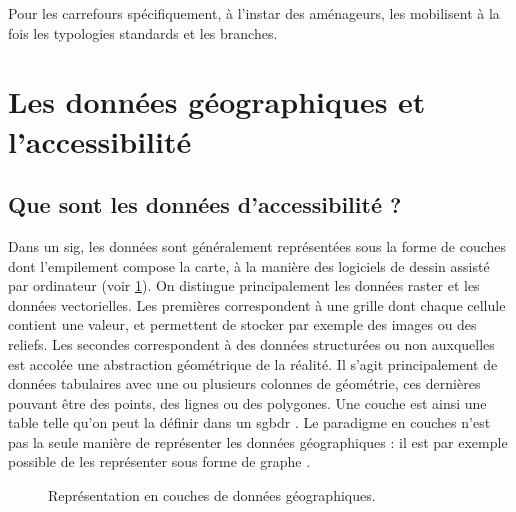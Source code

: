 Pour les carrefours spécifiquement, à l'instar des aménageurs, les \ipas{} mobilisent à la fois les typologies standards et les branches. 

\section{Les données géographiques et l'accessibilité}

\subsection{Que sont les données d'accessibilité ?}


Dans un \gls{sig}, les données sont généralement représentées sous la forme de couches dont l'empilement compose la carte, à la manière des logiciels de dessin assisté par ordinateur (voir \ref{fig:geodatalayers}). On distingue principalement les données raster et les données vectorielles. Les premières correspondent à une grille dont chaque cellule contient une valeur, et permettent de stocker par exemple des images ou des reliefs. Les secondes correspondent à des données structurées ou non auxquelles est accolée une abstraction géométrique de la réalité. Il s'agit principalement de données tabulaires avec une ou plusieurs colonnes de géométrie, ces dernières pouvant être des points, des lignes ou des polygones. Une couche est ainsi une table telle qu'on peut la définir dans un \gls{sgbdr} \cite{AschanLeygonie2019}. Le paradigme en couches n'est pas la seule manière de représenter les données géographiques : il est par exemple possible de les représenter sous forme de graphe \cite{Palacio2003}.

\begin{figure}
    \centering
    \caption{
        Représentation en couches de données géographiques.}
    \label{fig:geodatalayers}
\end{figure}

